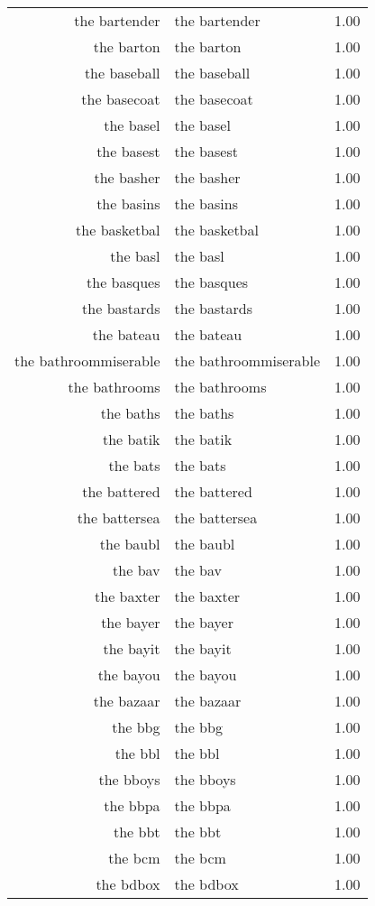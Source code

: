 \begin{table}[ht]
\begin{tabular}{rlr}
  the bartender & the bartender & 1.00 \\ 
  the barton & the barton & 1.00 \\ 
  the baseball & the baseball & 1.00 \\ 
  the basecoat & the basecoat & 1.00 \\ 
  the basel & the basel & 1.00 \\ 
  the basest & the basest & 1.00 \\ 
  the basher & the basher & 1.00 \\ 
  the basins & the basins & 1.00 \\ 
  the basketbal & the basketbal & 1.00 \\ 
  the basl & the basl & 1.00 \\ 
  the basques & the basques & 1.00 \\ 
  the bastards & the bastards & 1.00 \\ 
  the bateau & the bateau & 1.00 \\ 
  the bathroommiserable & the bathroommiserable & 1.00 \\ 
  the bathrooms & the bathrooms & 1.00 \\ 
  the baths & the baths & 1.00 \\ 
  the batik & the batik & 1.00 \\ 
  the bats & the bats & 1.00 \\ 
  the battered & the battered & 1.00 \\ 
  the battersea & the battersea & 1.00 \\ 
  the baubl & the baubl & 1.00 \\ 
  the bav & the bav & 1.00 \\ 
  the baxter & the baxter & 1.00 \\ 
  the bayer & the bayer & 1.00 \\ 
  the bayit & the bayit & 1.00 \\ 
  the bayou & the bayou & 1.00 \\ 
  the bazaar & the bazaar & 1.00 \\ 
  the bbg & the bbg & 1.00 \\ 
  the bbl & the bbl & 1.00 \\ 
  the bboys & the bboys & 1.00 \\ 
  the bbpa & the bbpa & 1.00 \\ 
  the bbt & the bbt & 1.00 \\ 
  the bcm & the bcm & 1.00 \\ 
  the bdbox & the bdbox & 1.00 \\ 

\end{tabular}
\end{table}
